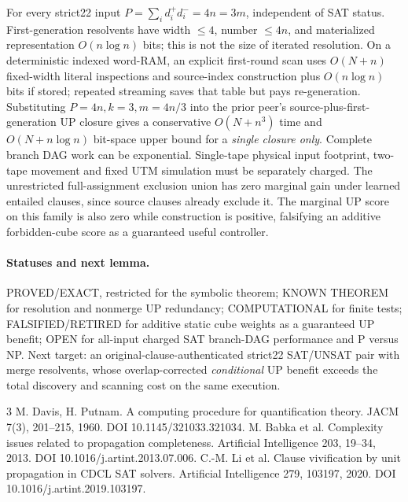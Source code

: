 \documentclass[10pt]{article}
\begin{document}
For every strict22 input $P=\sum_i d_i^+d_i^-=4n=3m$, independent of SAT status. First-generation resolvents have width $\le4$, number $\le4n$, and materialized representation $O(n\log n)$ bits; this is not the size of iterated resolution. On a deterministic indexed word-RAM, an explicit first-round scan uses $O(N+n)$ fixed-width literal inspections and source-index construction plus $O(n\log n)$ bits if stored; repeated streaming saves that table but pays re-generation. Substituting $P=4n,k=3,m=4n/3$ into the prior peer's source-plus-first-generation UP closure gives a conservative $O(N+n^3)$ time and $O(N+n\log n)$ bit-space upper bound for a \emph{single closure only}. Complete branch DAG work can be exponential. Single-tape physical input footprint, two-tape movement and fixed UTM simulation must be separately charged. The unrestricted full-assignment exclusion union has zero marginal gain under learned entailed clauses, since source clauses already exclude it. The marginal UP score on this family is also zero while construction is positive, falsifying an additive forbidden-cube score as a guaranteed useful controller.

\paragraph{Statuses and next lemma.}
PROVED/EXACT, restricted for the symbolic theorem; KNOWN THEOREM for resolution and nonmerge UP redundancy; COMPUTATIONAL for finite tests; FALSIFIED/RETIRED for additive static cube weights as a guaranteed UP benefit; OPEN for all-input charged SAT branch-DAG performance and P versus NP. Next target: an original-clause-authenticated strict22 SAT/UNSAT pair with merge resolvents, whose overlap-corrected \emph{conditional} UP benefit exceeds the total discovery and scanning cost on the same execution.

\begin{thebibliography}{3}
 M. Davis, H. Putnam. A computing procedure for quantification theory. JACM 7(3), 201--215, 1960. DOI 10.1145/321033.321034.
 M. Babka et al. Complexity issues related to propagation completeness. Artificial Intelligence 203, 19--34, 2013. DOI 10.1016/j.artint.2013.07.006.
 C.-M. Li et al. Clause vivification by unit propagation in CDCL SAT solvers. Artificial Intelligence 279, 103197, 2020. DOI 10.1016/j.artint.2019.103197.
\end{thebibliography}
\end{document}
